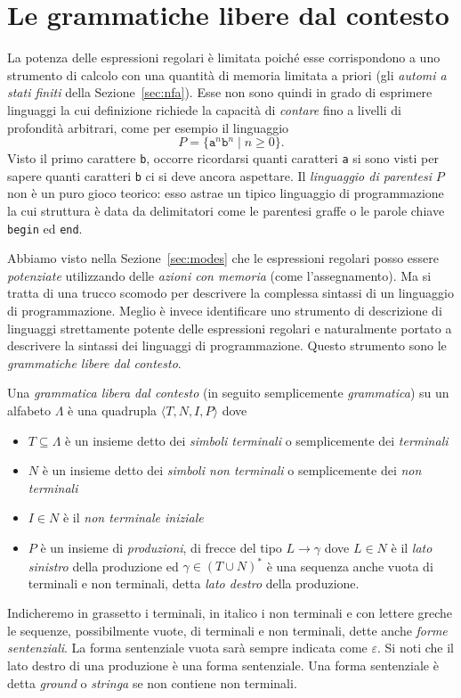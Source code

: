 \section{Le grammatiche libere dal contesto}\label{sec:grammar}
%
La potenza delle espressioni regolari \`e limitata poich\'e esse
corrispondono a uno strumento di calcolo con una quantit\`a di memoria
limitata a priori (gli \emph{automi a stati finiti} della
Sezione~\ref{sec:nfa}). Esse non sono quindi in grado di esprimere
linguaggi la cui definizione richiede la capacit\`a di \emph{contare}
fino a livelli di profondit\`a arbitrari, come per esempio il linguaggio
%
\[
  P=\{\mathtt{a}^n\mathtt{b}^n\mid n\ge 0\}.
\]
Visto il primo carattere \texttt{b}, occorre ricordarsi quanti caratteri
\texttt{a} si sono visti per sapere quanti caratteri \texttt{b}
ci si deve ancora aspettare. Il \emph{linguaggio di parentesi} $P$ non \`e
un puro gioco teorico: esso astrae un tipico linguaggio di programmazione
la cui struttura \`e data da delimitatori come le parentesi graffe
o le parole chiave \texttt{begin} ed \texttt{end}.

Abbiamo visto nella Sezione~\ref{sec:modes} che le espressioni regolari
posso essere \emph{potenziate} utilizzando delle \emph{azioni con memoria}
(come l'assegnamento). Ma si tratta di una trucco scomodo per descrivere
la complessa sintassi di un linguaggio di programmazione. Meglio \`e invece
identificare uno strumento di descrizione di linguaggi strettamente \piu
potente delle espressioni regolari e naturalmente portato a descrivere la
sintassi dei linguaggi di programmazione. Questo strumento sono le
\emph{grammatiche libere dal contesto}.
%
\begin{definition}\label{def:grammar}
Una \emph{grammatica libera dal contesto} (in seguito semplicemente
\emph{grammatica}) su un alfabeto $\Lambda$
\`e una quadrupla $\langle T,N,I,P\rangle$ dove
\begin{itemize}
\item $T\subseteq\Lambda$
      \`e un insieme detto dei \emph{simboli terminali} o semplicemente
      dei \emph{terminali}
\item $N$ \`e un insieme
      detto dei \emph{simboli non terminali} o semplicemente
      dei \emph{non terminali}
\item $I\in N$ \`e il \emph{non terminale iniziale}
\item $P$ \`e un insieme di \emph{produzioni}, \cioe di frecce del tipo
      $L\to\gamma$ dove $L\in N$ \`e il \emph{lato sinistro} della produzione
      ed $\gamma\in (T\cup N)^*$ \`e una sequenza anche vuota di terminali e
      non terminali, detta \emph{lato destro} della produzione.
\end{itemize}
%
Indicheremo in grassetto i terminali, in italico
i non terminali e con lettere greche le sequenze, possibilmente vuote,
di terminali e non terminali, dette anche \emph{forme sentenziali}.
La forma sentenziale vuota sar\`a sempre indicata come $\varepsilon$. Si noti
che il lato destro di una produzione \`e una forma sentenziale.
Una forma sentenziale \`e detta \emph{ground} o \emph{stringa}
se non contiene non terminali.
\end{definition}

